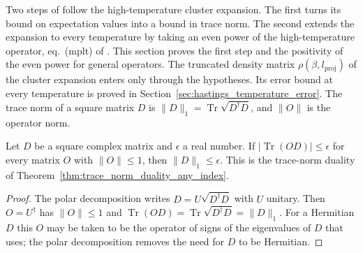 Two steps of \cite[Section~IV]{Hastings2006Solving} follow the high-temperature
cluster expansion. The first turns its bound on expectation values into a bound
in trace norm. The second extends the expansion to every temperature by taking an
even power of the high-temperature operator, eq.~(mplt) of
\cite[lines 1303--1317]{Hastings2006Solving}. This section proves the first step
and the positivity of the even power for general operators. The truncated
density matrix $\rho(\beta,l_{\mathrm{proj}})$ of the cluster expansion enters
only through the hypotheses. Its error bound at every temperature
\cite[lines 1322--1349]{Hastings2006Solving} is proved in
Section~\ref{sec:hastings_temperature_error}. The trace norm of a square matrix $D$ is
$\|D\|_1=\operatorname{Tr}\sqrt{D^\dagger D}$, and $\|O\|$ is the operator norm.

\begin{lemma}
    \label{thm:hastings_thermal_trace_norm_duality}
    \leanok
    Let $D$ be a square complex matrix and $\epsilon$ a real number. If
    $|\operatorname{Tr}(OD)|\le\epsilon$ for every matrix $O$ with
    $\|O\|\le1$, then $\|D\|_1\le\epsilon$. This is the trace-norm duality of
    Theorem~\ref{thm:trace_norm_duality_any_index}.
\end{lemma}
\begin{proof}\leanok
    The polar decomposition writes $D=U\sqrt{D^\dagger D}$ with $U$ unitary.
    Then $O=U^\dagger$ has $\|O\|\le1$ and
    $\operatorname{Tr}(OD)=\operatorname{Tr}\sqrt{D^\dagger D}=\|D\|_1$. For a
    Hermitian $D$ this $O$ may be taken to be the operator of signs of the
    eigenvalues of $D$ that \cite[lines 1291--1294]{Hastings2006Solving} uses;
    the polar decomposition removes the need for $D$ to be Hermitian.
\end{proof}

